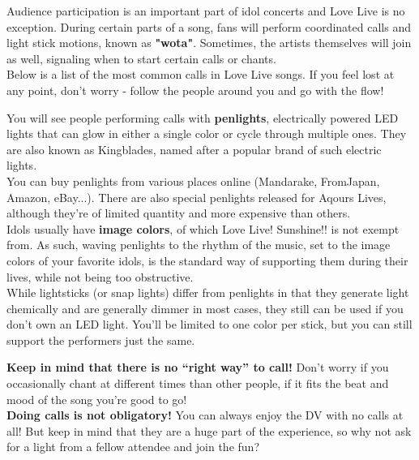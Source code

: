 \ifdefined\COMPLETE
\else
	
	
\fi

\def\pagetitletext{What are Calls?}

Audience participation is an important part of idol concerts and Love Live is no exception. During certain parts of a song, fans will perform coordinated calls and light stick motions, known as \textbf{"wota"}. Sometimes, the artists themselves will join as well, signaling when to start certain calls or chants.\\

Below is a list of the most common calls in Love Live songs. If you feel lost at any point, don’t worry - follow the people around you and go with the flow!\\
\vfill

You will see people performing calls with \textbf{penlights}, electrically powered LED lights that can glow in either a single color or cycle through multiple ones. They are also known as Kingblades, named after a popular brand of such electric lights.\\

You can buy penlights from various places online (Mandarake, FromJapan, Amazon, eBay...). There are also special penlights released for Aqours Lives, although they’re of limited quantity and more expensive than others.\\

Idols usually have \textbf{image colors}, of which Love Live! Sunshine!! is not exempt from. As such, waving penlights to the rhythm of the music, set to the image colors of your favorite idols, is the standard way of supporting them during their lives, while not being too obstructive.\\

While lightsticks (or snap lights) differ from penlights in that they generate light chemically and are generally dimmer in most cases, they still can be used if you don't own an LED light. You'll be limited to one color per stick, but you can still support the performers just the same.\\

\vfill

\textbf{Keep in mind that there is no “right way” to call!} Don’t worry if you occasionally chant at different times than other people, if it fits the beat and mood of the song you’re good to go!\\

\textbf{Doing calls is not obligatory!}  You can always enjoy the DV with no calls at all! But keep in mind that they are a huge part of the experience, so why not ask for a light from a fellow attendee and join the fun?

